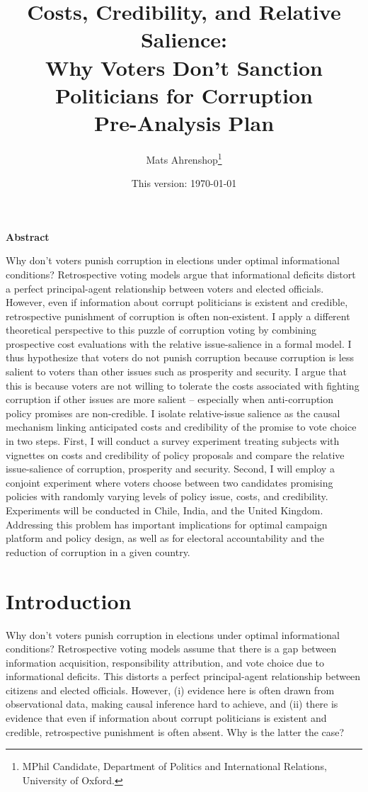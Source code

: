 \documentclass[11pt]{article}
\title{Costs, Credibility, and Relative Salience: \\ Why Voters Don't Sanction Politicians for Corruption \\ Pre-Analysis Plan}
\author{Mats Ahrenshop\thanks{MPhil Candidate, Department of Politics and International Relations, University of Oxford.}}
\date{This version: \today}
\begin{document}
\maketitle
\thispagestyle{empty}
\begin{onehalfspace}
\begin{center}
\textbf{Abstract}
\end{center}

\noindent Why don’t voters punish corruption in elections under optimal informational conditions? Retrospective voting models argue that informational deficits distort a perfect principal-agent relationship between voters and elected officials. However, even if information about corrupt politicians is existent and credible, retrospective punishment of corruption is often non-existent.
I apply a different theoretical perspective to this puzzle of corruption voting by combining prospective cost evaluations with the relative issue-salience in a formal model. I thus hypothesize that voters do not punish corruption because corruption is less salient to voters than other issues such as prosperity and security. I argue that this is because voters are not willing to tolerate the costs associated with fighting corruption if other issues are more salient -- especially when anti-corruption policy promises are non-credible.
I isolate relative-issue salience as the causal mechanism linking anticipated costs and credibility of the promise to vote choice in two steps. First, I will conduct a survey experiment treating subjects with vignettes on costs and credibility of policy proposals and compare the relative issue-salience of corruption, prosperity and security. Second, I will employ a conjoint experiment where voters choose between two candidates promising policies with randomly varying levels of policy issue, costs, and credibility. Experiments will be conducted in Chile, India, and the United Kingdom.
Addressing this problem has important implications for optimal campaign platform and policy design, as well as for electoral accountability and the reduction of corruption in a given country.
\end{onehalfspace}

\newpage
\thispagestyle{empty}
\begin{small}
\tableofcontents
\end{small}

\newpage
\doublespacing
\setcounter{page}{1}

\section{Introduction}
Why don't voters punish corruption in elections under optimal informational conditions? Retrospective voting models assume that there is a gap between information acquisition, responsibility attribution, and vote choice due to informational deficits. This distorts a perfect principal-agent relationship between citizens and elected officials. However, (i) evidence here is often drawn from observational data, making causal inference hard to achieve, and (ii) there is evidence that even if information about corrupt politicians is existent and credible, retrospective punishment is often absent. Why is the latter the case?
\end{document}
